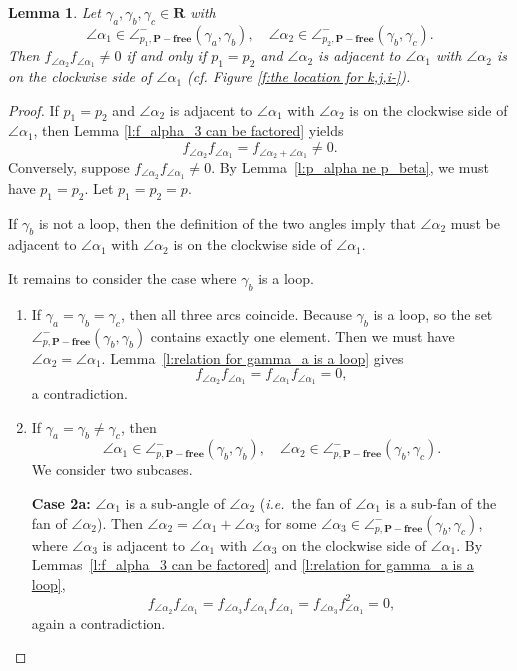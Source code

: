 \documentclass[a4paper,10pt]{amsart}
\theoremstyle{plain}          %
\newtheorem{lemma}[theorem]{Lemma}
\theoremstyle{definition}
\newcommand{\ha}{\angle^-}
\newcommand{\ie}{{\em i.e.}\ }
\begin{document}
\begin{lemma}\label{l:conditions for if and only if p_alphap_beta neq 0}
    Let $\gamma_a,\gamma_b,\gamma_c\in\mathbf{R}$ with $$\angle\alpha_1\in\ha_{p_1, \mathbf{P-free}}(\gamma_a,\gamma_b),\quad \angle\alpha_2\in\ha_{p_2,\mathbf{P-free}}(\gamma_b,\gamma_c).$$
Then $f_{\angle\alpha_2} f_{\angle\alpha_1}\neq 0$ if and only if  $p_1= p_2$ and  $\angle\alpha_2$ is adjacent to $\angle\alpha_1$ with $\angle\alpha_2$ is on the clockwise side of $\angle\alpha_1$ (cf.  Figure \ref{f:the location for k,j,i-}).
   \end{lemma}
\begin{proof} If  $p_1=p_2$ and $\angle\alpha_2$ is adjacent to $\angle\alpha_1$ with $\angle\alpha_2$ is on the clockwise side of $\angle\alpha_1$, then Lemma \ref{l:f_alpha_3 can be factored} yields $$f_{\angle\alpha_2} f_{\angle\alpha_1}=f_{\angle\alpha_2+\angle\alpha_1}\neq 0.$$
Conversely, suppose $f_{\angle\alpha_2} f_{\angle\alpha_1}\neq 0$. By Lemma~\ref{l:p_alpha ne p_beta}, we must have $p_1=p_2$. Let $p_1=p_2=p$. 

If $\gamma_b$ is not a loop, then the definition of the two angles imply that $\angle\alpha_2$ must be  adjacent to $\angle\alpha_1$ with $\angle\alpha_2$ is on the clockwise side of $\angle\alpha_1$.

It remains to consider the case where $\gamma_b$ is a loop. 
   \begin{enumerate}
       \item If $\gamma_a=\gamma_b=\gamma_c$, then all three arcs coincide. Because  $\gamma_b$ is a loop, so the set $\ha_{p, \mathbf{P}-\textbf{free}}(\gamma_b,\gamma_b)$ contains exactly one element. Then we must have   $\angle\alpha_2=\angle\alpha_1$. Lemma~\ref{l:relation for gamma_a is a loop} gives $$f_{\angle\alpha_2} f_{\angle\alpha_1}=f_{\angle\alpha_1} f_{\angle\alpha_1}=0,$$ a contradiction.
  \item If $\gamma_a=\gamma_b\neq \gamma_c$, then 
        \[
        \angle\alpha_1\in\ha_{p, \mathbf{P}-\mathbf{free}}(\gamma_b,\gamma_b),\quad 
        \angle\alpha_2\in\ha_{p,\mathbf{P}-\mathbf{free}}(\gamma_b,\gamma_c).
        \]
        We consider two subcases.
        
        \textbf{Case 2a:} $\angle\alpha_1$ is a sub-angle of $\angle\alpha_2$ (\ie the fan of  $\angle\alpha_1$ is a sub-fan  of the fan of $\angle\alpha_2$). Then $\angle\alpha_2=\angle\alpha_1+\angle\alpha_3$ for some $\angle\alpha_3\in\ha_{p,\mathbf{P}-\mathbf{free}}(\gamma_b,\gamma_c)$, where $\angle\alpha_3$ is adjacent to $\angle\alpha_1$ with $\angle\alpha_3$ on the clockwise side of $\angle\alpha_1$. By Lemmas~\ref{l:f_alpha_3 can be factored} and \ref{l:relation for gamma_a is a loop},
        \[
        f_{\angle\alpha_2}f_{\angle\alpha_1}=f_{\angle\alpha_3}f_{\angle\alpha_1}f_{\angle\alpha_1}=f_{\angle\alpha_3}f_{\angle\alpha_1}^2=0,
        \]
        again a contradiction.
        

\end{enumerate}
\end{proof}
\end{document}
